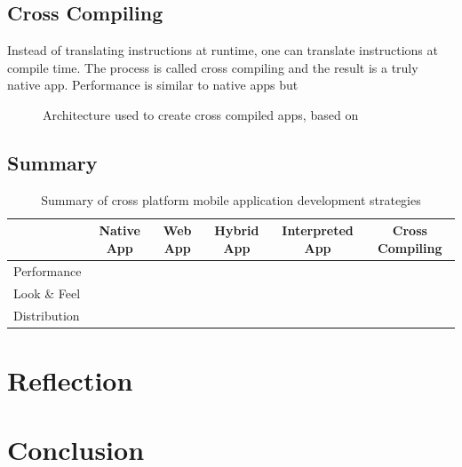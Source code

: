 \subsection{Cross Compiling}

\npar Instead of translating instructions at runtime, one can translate instructions at compile time. The process is called cross compiling and the result is a truly native app. Performance is similar to native apps but 

\begin{figure}
    \begin{center}
        \caption{
            Architecture used to create cross compiled apps, based on \citep{Friese}
        }
        \label{fig:crosscompiled}
    \end{center}
\end{figure}

\subsection{Summary}

\begin{table}
    \begin{center}
        \begin{tabular}{l|c|c|c|c|c}
                         & Native App & Web App & Hybrid App & Interpreted App & Cross Compiling\\\hline
            Performance  &            &         &            &                 &                \\
            Look \& Feel &            &         &            &                 &                \\
            Distribution &            &         &            &                 &                \\
            
        \end{tabular}
		\caption{
			Summary of cross platform mobile application development strategies
		}
		\label{tab:architectures}
    \end{center}
\end{table}

\npar

\section{Reflection}

\section{Conclusion}
